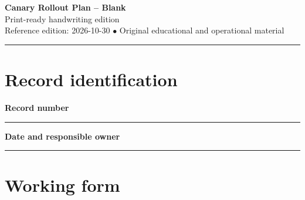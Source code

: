 \documentclass[10pt,letterpaper]{article}
\begin{document}
\begin{center}
{\LARGE\bfseries\color{cdblue}Canary Rollout Plan -- Blank}\\[7pt]
{\large Print-ready handwriting edition}\\[6pt]
{\small Reference edition: 2026-10-30 $\bullet$ Original educational and operational material}
\end{center}
\noindent\color{cdblue}\rule{\linewidth}{1.2pt}\color{black}
\vspace{0.4em}
\section{Record identification}
\textbf{Record number}\par
\noindent\rule{\linewidth}{0.35pt}\par\vspace{0.7em}
\textbf{Date and responsible owner}\par
\noindent\rule{\linewidth}{0.35pt}\par\vspace{0.7em}

\section{Working form}
\end{document}
